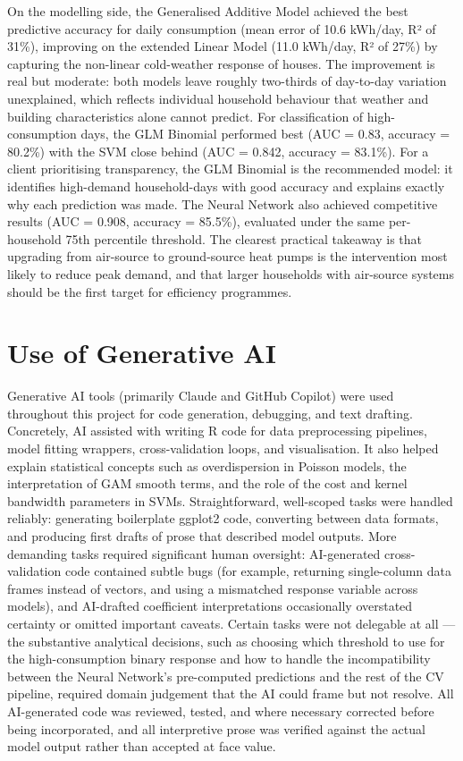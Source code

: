 \documentclass[
]{article}
\begin{document}
On the modelling side, the Generalised Additive Model achieved the best
predictive accuracy for daily consumption (mean error of 10.6 kWh/day,
R² of 31\%), improving on the extended Linear Model (11.0 kWh/day, R² of
27\%) by capturing the non-linear cold-weather response of houses. The
improvement is real but moderate: both models leave roughly two-thirds
of day-to-day variation unexplained, which reflects individual household
behaviour that weather and building characteristics alone cannot
predict. For classification of high- consumption days, the GLM Binomial
performed best (AUC = 0.83, accuracy = 80.2\%) with the SVM close behind
(AUC = 0.842, accuracy = 83.1\%). For a client prioritising
transparency, the GLM Binomial is the recommended model: it identifies
high-demand household-days with good accuracy and explains exactly why
each prediction was made. The Neural Network also achieved competitive
results (AUC = 0.908, accuracy = 85.5\%), evaluated under the same
per-household 75th percentile threshold. The clearest practical takeaway
is that upgrading from air-source to ground-source heat pumps is the
intervention most likely to reduce peak demand, and that larger
households with air-source systems should be the first target for
efficiency programmes.

\section{Use of Generative AI}\label{ai}

Generative AI tools (primarily Claude and GitHub Copilot) were used
throughout this project for code generation, debugging, and text
drafting. Concretely, AI assisted with writing R code for data
preprocessing pipelines, model fitting wrappers, cross-validation loops,
and visualisation. It also helped explain statistical concepts such as
overdispersion in Poisson models, the interpretation of GAM smooth
terms, and the role of the cost and kernel bandwidth parameters in SVMs.
Straightforward, well-scoped tasks were handled reliably: generating
boilerplate ggplot2 code, converting between data formats, and producing
first drafts of prose that described model outputs. More demanding tasks
required significant human oversight: AI-generated cross-validation code
contained subtle bugs (for example, returning single-column data frames
instead of vectors, and using a mismatched response variable across
models), and AI-drafted coefficient interpretations occasionally
overstated certainty or omitted important caveats. Certain tasks were
not delegable at all --- the substantive analytical decisions, such as
choosing which threshold to use for the high-consumption binary response
and how to handle the incompatibility between the Neural Network's
pre-computed predictions and the rest of the CV pipeline, required
domain judgement that the AI could frame but not resolve. All
AI-generated code was reviewed, tested, and where necessary corrected
before being incorporated, and all interpretive prose was verified
against the actual model output rather than accepted at face value.
\end{document}
